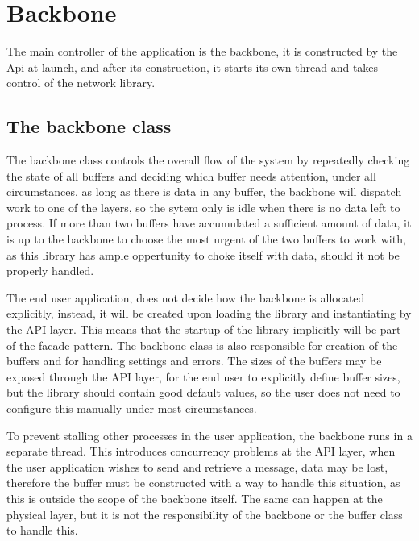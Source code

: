 \chapter{Backbone}
The main controller of the application is the backbone, it is constructed by the Api at launch, and after its construction, it starts its own thread and takes control of the network library.

\section{The backbone class}
The backbone class controls the overall flow of the system by repeatedly checking the state of all buffers and deciding which buffer needs attention, under all circumstances, as long as there is data in any buffer, the backbone will dispatch work to one of the layers, so the sytem only is idle when there is no data left to process.
If more than two buffers have accumulated a sufficient amount of data, it is up to the backbone to choose the most urgent of the two buffers to work with, as this library has ample oppertunity to choke itself with data, should it not be properly handled.

The end user application, does not decide how the backbone is allocated explicitly, instead, it will be created upon loading the library and instantiating by the API layer. This means that the startup of the library implicitly will be part of the facade pattern.
The backbone class is also responsible for creation of the buffers and for handling settings and errors. The sizes of the buffers may be exposed through the API layer, for the end user to explicitly define buffer sizes, but the library should contain good default values, so the user does not need to configure this manually under most circumstances.

To prevent stalling other processes in the user application, the backbone runs in a separate thread. This introduces concurrency problems at the API layer, when the user application wishes to send and retrieve a message, data may be lost, therefore the buffer must be constructed with a way to handle this situation, as this is outside the scope of the backbone itself.
The same can happen at the physical layer, but it is not the responsibility of the backbone or the buffer class to handle this.

